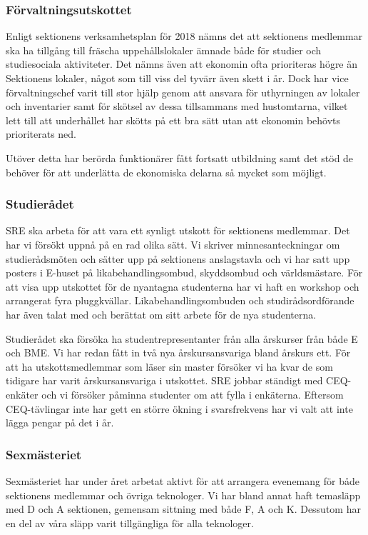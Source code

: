 \documentclass[../_main/handlingar.tex]{subfiles}
\begin{document}
\subsubsection*{Förvaltningsutskottet}
Enligt sektionens verksamhetsplan för 2018 nämns det att sektionens medlemmar ska ha tillgång till fräscha uppehållslokaler ämnade både för studier och studiesociala aktiviteter. Det nämns även att ekonomin ofta prioriteras högre än Sektionens lokaler, något som till viss del tyvärr även skett i år. Dock har vice förvaltningschef varit till stor hjälp genom att ansvara för uthyrningen av lokaler och inventarier samt för skötsel av dessa tillsammans med hustomtarna, vilket lett till att underhållet har skötts på ett bra sätt utan att ekonomin behövts prioriterats ned. 

Utöver detta har berörda funktionärer fått fortsatt utbildning samt det stöd de behöver för att underlätta de ekonomiska delarna så mycket som möjligt. 
\subsubsection*{Studierådet}
SRE ska arbeta för att vara ett synligt utskott för sektionens medlemmar. Det har vi försökt uppnå på en rad olika sätt. Vi skriver minnesanteckningar om studierådsmöten och sätter upp på sektionens anslagstavla och vi har satt upp posters i E-huset på likabehandlingsombud, skyddsombud och världsmästare. För att visa upp utskottet för de nyantagna studenterna har vi haft en workshop och arrangerat fyra pluggkvällar. Likabehandlingsombuden och studirådsordförande har även talat med och berättat om sitt arbete för de nya studenterna. 

Studierådet ska försöka ha studentrepresentanter från alla årskurser från både E och BME. Vi har redan fått in två nya årskursansvariga bland årskurs ett. För att ha utskottsmedlemmar som läser sin master försöker vi ha kvar de som tidigare har varit årskursansvariga i utskottet. SRE jobbar ständigt med CEQ-enkäter och vi försöker påminna studenter om att fylla i enkäterna. Eftersom CEQ-tävlingar inte har gett en större ökning i svarsfrekvens har vi valt att inte lägga pengar på det i år. 
\subsubsection*{Sexmästeriet}
Sexmästeriet har under året arbetat aktivt för att arrangera evenemang för både sektionens medlemmar och övriga teknologer. Vi har bland annat haft temasläpp med D och A sektionen, gemensam sittning med både F, A och K. Dessutom har en del av våra släpp varit tillgängliga för alla teknologer. 
\end{document}
